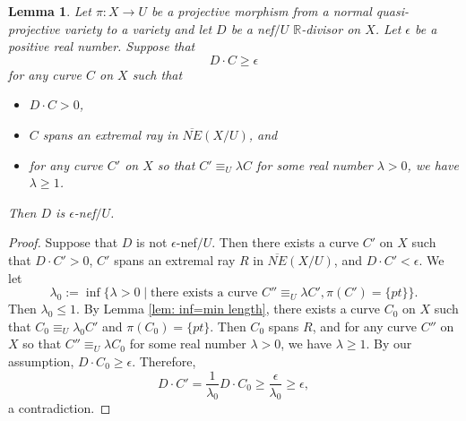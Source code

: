 \documentclass[11pt]{amsart}
\numberwithin{equation}{section}
\newcommand{\Rr}{\mathbb{R}}
\newtheorem{lem}[thm]{Lemma}
\theoremstyle{definition}
\theoremstyle{definition}
\theoremstyle{definition}
\begin{document}
\begin{lem}\label{lem: weak nqc only check smallest}
      Let $\pi: X\rightarrow U$ be a projective morphism from a normal quasi-projective variety to a variety and let $D$ be a nef$/U$ $\Rr$-divisor on $X$. Let $\epsilon$ be a positive real number. Suppose that
    $$D\cdot C\geq\epsilon$$
        for any curve $C$ on $X$ such that 
        \begin{itemize}
            \item $D\cdot C>0$,
            \item  $C$ spans an extremal ray in $\overline{NE}(X/U)$, and
            \item for any curve $C'$ on $X$ so that $C'\equiv_U\lambda C$ for some real number $\lambda>0$, we have $\lambda\geq 1$.
        \end{itemize}
        Then $D$ is $\epsilon$-nef$/U$.
\end{lem}
\begin{proof}
Suppose that $D$ is not $\epsilon$-nef$/U$. Then there exists a curve $C'$ on $X$ such that $D\cdot C'>0$, $C'$ spans an extremal ray $R$ in $\overline{NE}(X/U)$, and $D\cdot C'<\epsilon$. We let
$$\lambda_0:=\inf\{\lambda>0\mid \text{there exists a curve }C''\equiv_U\lambda C', \pi(C')=\{pt\}\}.$$
Then $\lambda_0\leq 1$. By Lemma \ref{lem: inf=min length}, there exists a curve $C_0$ on $X$ such that $C_0\equiv_U\lambda_0C'$ and $\pi(C_0)=\{pt\}$. Then $C_0$ spans $R$, and for any curve $C''$ on $X$ so that $C''\equiv_U\lambda C_0$ for some real number $\lambda>0$, we have $\lambda\geq 1$. By our assumption, $D\cdot C_0\geq\epsilon$. Therefore,
$$D\cdot C'=\frac{1}{\lambda_0}D\cdot C_0\geq\frac{\epsilon}{\lambda_0}\geq\epsilon,$$
a contradiction.
\end{proof}
\end{document}
